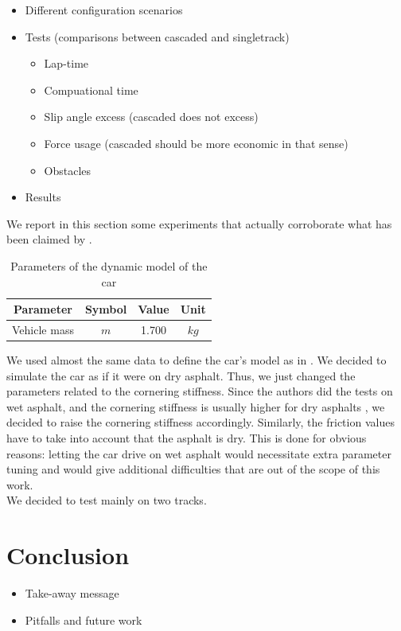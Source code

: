 \documentclass[a4paper, onecolumn, 12pt]{article}
\begin{document}
\begin{itemize}
    \item Different configuration scenarios
    \item Tests (comparisons between cascaded and singletrack)
    \begin{itemize}
        \item Lap-time
        \item Compuational time
        \item Slip angle excess (cascaded does not excess)
        \item Force usage (cascaded should be more economic in that sense)
        \item Obstacles
    \end{itemize}
    \item Results
\end{itemize}
We report in this section some experiments that actually corroborate what has
been claimed by \cite{paper}. 
\begin{table}[H]
    \centering
    \caption{Parameters of the dynamic model of the car} \label{params}
    \begin{tabular}{ |c|c|c|c| }
        \hline
        \textbf{Parameter} & \textbf{Symbol} & \textbf{Value} & \textbf{Unit} \\ [0.5ex] 
        \hline
        \hline 
        Vehicle mass & $m$ & 1.700 & $kg$\\ 
        \hline
    \end{tabular}
\end{table}
We used almost the same data to define the car's model as in \cite{paper}. We
decided to simulate the car as if it were on dry asphalt. Thus, we just changed
the parameters related to the cornering stiffness. Since the authors did the
tests on wet asphalt, and the cornering stiffness is usually higher for dry
asphalts \cite{stiffness}, we decided to raise the cornering stiffness
accordingly. Similarly, the friction values have to take into account that the
asphalt is dry. This is done for obvious reasons: letting the car drive on wet
asphalt would necessitate extra parameter tuning and would give additional
difficulties that are out of the scope of this work. \\
We decided to test mainly on two tracks.




\newpage
\section{Conclusion}

\begin{itemize}
    \item Take-away message
    \item Pitfalls and future work
\end{itemize}




\end{document}
